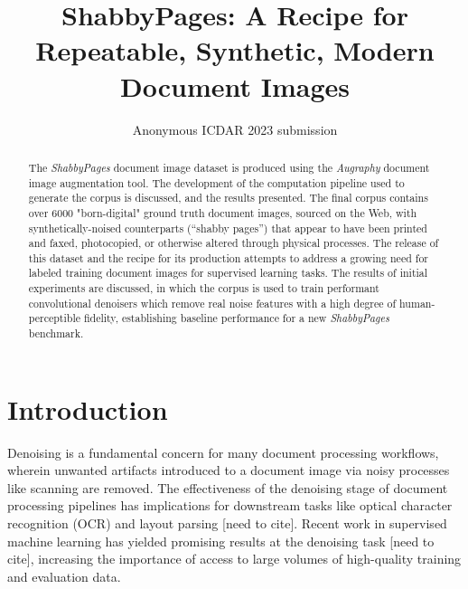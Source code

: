\documentclass[runningheads]{llncs}
\begin{document}
\title{ShabbyPages: A Recipe for Repeatable, Synthetic, Modern Document Images}
%
%

\author{Anonymous ICDAR 2023 submission}


\maketitle

\begin{abstract}
The \emph{ShabbyPages} document image dataset is produced using the \emph{Augraphy} document image augmentation tool.
The development of the computation pipeline used to generate the corpus is discussed, and the results presented.
The final corpus contains over 6000 "born-digital" ground truth document images, sourced on the Web, with synthetically-noised counterparts (``shabby pages'') that appear to have been printed and faxed, photocopied, or otherwise altered through physical processes.
The release of this dataset and the recipe for its production attempts to address a growing need for labeled training document images for supervised learning tasks.
The results of initial experiments are discussed, in which the corpus is used to train performant convolutional denoisers which remove real noise features with a high degree of human-perceptible fidelity, establishing baseline performance for a new \emph{ShabbyPages} benchmark.
\end{abstract}

\section{Introduction}
Denoising is a fundamental concern for many document processing workflows, wherein unwanted artifacts introduced to a document image via noisy processes like scanning are removed.
The effectiveness of the denoising stage of document processing pipelines has implications for downstream tasks like optical character recognition (OCR) and layout parsing [need to cite].
Recent work in supervised machine learning has yielded promising results at the denoising task [need to cite], increasing the importance of access to large volumes of high-quality training and evaluation data.
\end{document}
